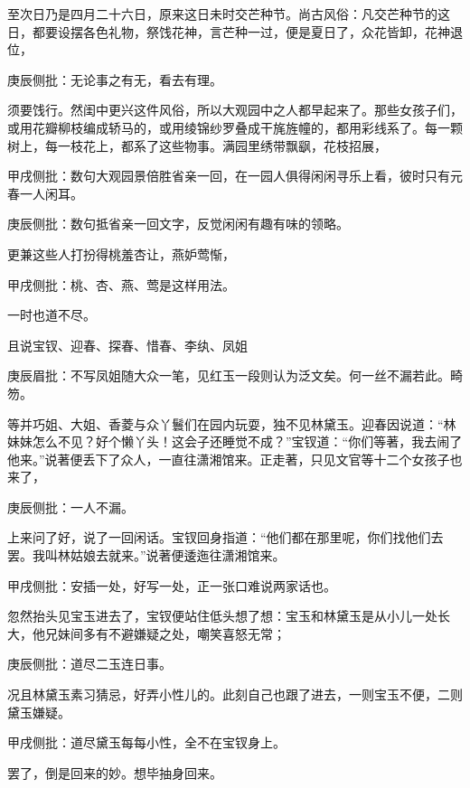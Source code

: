 \begin{parag}
    至次日乃是四月二十六日，原来这日未时交芒种节。尚古风俗：凡交芒种节的这日，都要设摆各色礼物，祭饯花神，言芒种一过，便是夏日了，众花皆卸，花神退位，\begin{note}庚辰侧批：无论事之有无，看去有理。\end{note}须要饯行。然闺中更兴这件风俗，所以大观园中之人都早起来了。那些女孩子们，或用花瓣柳枝编成轿马的，或用绫锦纱罗叠成干旄旌幢的，都用彩线系了。每一颗树上，每一枝花上，都系了这些物事。满园里绣带飘飖，花枝招展，\begin{note}甲戌侧批：数句大观园景倍胜省亲一回，在一园人俱得闲闲寻乐上看，彼时只有元春一人闲耳。\end{note}\begin{note}庚辰侧批：数句抵省亲一回文字，反觉闲闲有趣有味的领略。\end{note}更兼这些人打扮得桃羞杏让，燕妒莺惭，\begin{note}甲戌侧批：桃、杏、燕、莺是这样用法。\end{note}一时也道不尽。
\end{parag}


\begin{parag}
    且说宝钗、迎春、探春、惜春、李纨、凤姐\begin{note}庚辰眉批：不写凤姐随大众一笔，见红玉一段则认为泛文矣。何一丝不漏若此。畸笏。\end{note}等并巧姐、大姐、香菱与众丫鬟们在园内玩耍，独不见林黛玉。迎春因说道：“林妹妹怎么不见？好个懒丫头！这会子还睡觉不成？”宝钗道：“你们等著，我去闹了他来。”说著便丢下了众人，一直往潇湘馆来。正走著，只见文官等十二个女孩子也来了，\begin{note}庚辰侧批：一人不漏。\end{note}上来问了好，说了一回闲话。宝钗回身指道：“他们都在那里呢，你们找他们去罢。我叫林姑娘去就来。”说著便逶迤往潇湘馆来。\begin{note}甲戌侧批：安插一处，好写一处，正一张口难说两家话也。\end{note}忽然抬头见宝玉进去了，宝钗便站住低头想了想：宝玉和林黛玉是从小儿一处长大，他兄妹间多有不避嫌疑之处，嘲笑喜怒无常；\begin{note}庚辰侧批：道尽二玉连日事。\end{note}况且林黛玉素习猜忌，好弄小性儿的。此刻自己也跟了进去，一则宝玉不便，二则黛玉嫌疑。\begin{note}甲戌侧批：道尽黛玉每每小性，全不在宝钗身上。\end{note}罢了，倒是回来的妙。想毕抽身回来。
\end{parag}


